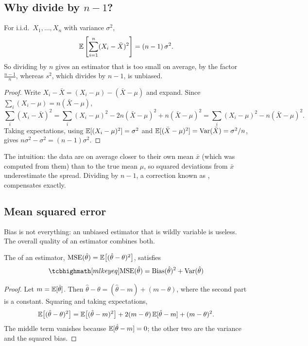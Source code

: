 \subsection{Why divide by \texorpdfstring{$n - 1$}{n-1}?}

\begin{theorem}\label{thm:bessel}
For i.i.d.\ $X_1, \dots, X_n$ with variance $\sigma^2$,
\[
  \mathbb{E}\left[\sum_{i=1}^n(X_i - \bar X)^2\right] = (n - 1)\,\sigma^2 .
\]
So dividing by $n$ gives an estimator that is too small on average, by the
factor $\frac{n-1}{n}$, whereas $s^2$, which divides by $n - 1$, is unbiased.
\end{theorem}

\begin{proof}
Write $X_i - \bar X = (X_i - \mu) - (\bar X - \mu)$ and expand. Since
$\sum_i(X_i - \mu) = n(\bar X - \mu)$,
\[
  \sum_i(X_i - \bar X)^2 = \sum_i(X_i - \mu)^2 - 2n(\bar X - \mu)^2 + n(\bar X - \mu)^2
  = \sum_i(X_i - \mu)^2 - n(\bar X - \mu)^2 .
\]
Taking expectations, using $\mathbb{E}[(X_i - \mu)^2] = \sigma^2$ and
$\mathbb{E}[(\bar X - \mu)^2] = \operatorname{Var}(\bar X) = \sigma^2/n$, gives
$n\sigma^2 - \sigma^2 = (n - 1)\sigma^2$.
\end{proof}

The intuition: the data are on average closer to their own mean $\bar x$ (which
was computed from them) than to the true mean $\mu$, so squared deviations from
$\bar x$ underestimate the spread. Dividing by $n - 1$, a correction known as
, compensates exactly.

\subsection{Mean squared error}

Bias is not everything: an unbiased estimator that is wildly variable is useless.
The overall quality of an estimator combines both.

\begin{theorem}\label{thm:mse-decomposition}
The  of an
estimator, $\operatorname{MSE}(\hat\theta) = \mathbb{E}\bigl[(\hat\theta - \theta)^2\bigr]$, satisfies
\[
  \keyeq{\MSE(\hat\theta) = \Bias(\hat\theta)^2 + \Var(\hat\theta)}
\]
\end{theorem}

\begin{proof}
Let $m = \mathbb{E}[\hat\theta]$. Then $\hat\theta - \theta = (\hat\theta - m) + (m -
\theta)$, where the second part is a constant. Squaring and taking expectations,
\[
  \mathbb{E}\bigl[(\hat\theta - \theta)^2\bigr] = \mathbb{E}\bigl[(\hat\theta - m)^2\bigr]
  + 2(m - \theta)\,\mathbb{E}[\hat\theta - m] + (m - \theta)^2 .
\]
The middle term vanishes because $\mathbb{E}[\hat\theta - m] = 0$; the other two are the
variance and the squared bias.
\end{proof}

